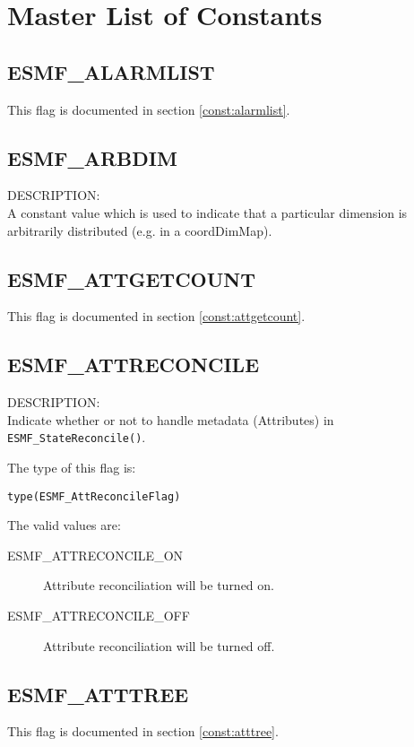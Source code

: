 
\section{Master List of Constants}

\subsection{ESMF\_ALARMLIST}
This flag is documented in section \ref{const:alarmlist}.

\subsection{ESMF\_ARBDIM}
\label{const:arbdim}

{\sf DESCRIPTION:\\}
A constant value which is used to indicate that a particular dimension is arbitrarily distributed (e.g. in a coordDimMap). 

\subsection{ESMF\_ATTGETCOUNT}
This flag is documented in section \ref{const:attgetcount}.


\subsection{ESMF\_ATTRECONCILE}
\label{const:attreconcile}
{\sf DESCRIPTION:\\}
Indicate whether or not to handle metadata (Attributes) in {\tt ESMF\_StateReconcile()}.

The type of this flag is:

{\tt type(ESMF\_AttReconcileFlag)}

The valid values are:
\begin{description}
	\item[ESMF\_ATTRECONCILE\_ON]
	Attribute reconciliation will be turned on.
	\item[ESMF\_ATTRECONCILE\_OFF]
	Attribute reconciliation will be turned off.
\end{description}


\subsection{ESMF\_ATTTREE}
This flag is documented in section \ref{const:atttree}.

